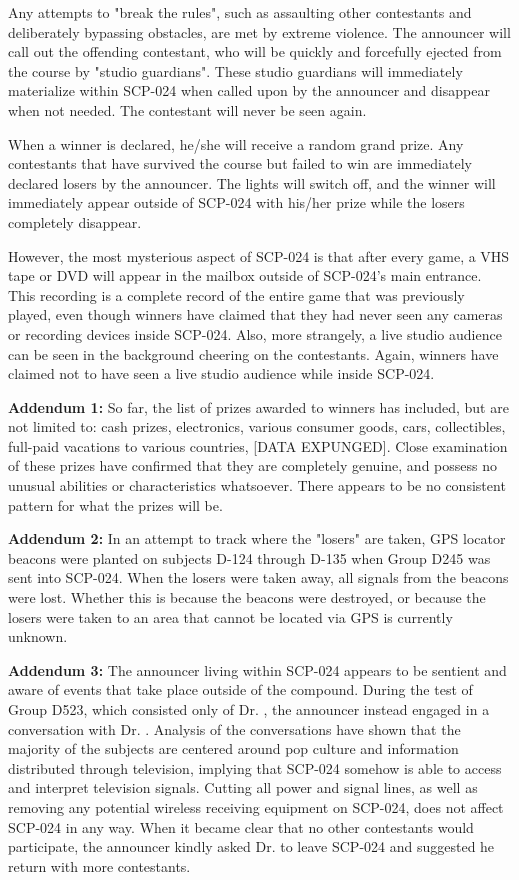 Any attempts to "break the rules", such as assaulting other contestants and deliberately bypassing obstacles, are met by extreme violence. The announcer will call out the offending contestant, who will be quickly and forcefully ejected from the course by "studio guardians". These studio guardians will immediately materialize within SCP-024 when called upon by the announcer and disappear when not needed. The contestant will never be seen again.

When a winner is declared, he/she will receive a random grand prize. Any contestants that have survived the course but failed to win are immediately declared losers by the announcer. The lights will switch off, and the winner will immediately appear outside of SCP-024 with his/her prize while the losers completely disappear.

However, the most mysterious aspect of SCP-024 is that after every game, a VHS tape or DVD will appear in the mailbox outside of SCP-024's main entrance. This recording is a complete record of the entire game that was previously played, even though winners have claimed that they had never seen any cameras or recording devices inside SCP-024. Also, more strangely, a live studio audience can be seen in the background cheering on the contestants. Again, winners have claimed not to have seen a live studio audience while inside SCP-024.

\textbf{Addendum 1:} So far, the list of prizes awarded to winners has included, but are not limited to: cash prizes, electronics, various consumer goods, cars, collectibles, full-paid vacations to various countries, [DATA EXPUNGED]. Close examination of these prizes have confirmed that they are completely genuine, and possess no unusual abilities or characteristics whatsoever. There appears to be no consistent pattern for what the prizes will be.

\textbf{Addendum 2:} In an attempt to track where the "losers" are taken, GPS locator beacons were planted on subjects D-124 through D-135 when Group D245 was sent into SCP-024. When the losers were taken away, all signals from the beacons were lost. Whether this is because the beacons were destroyed, or because the losers were taken to an area that cannot be located via GPS is currently unknown.

\textbf{Addendum 3:} The announcer living within SCP-024 appears to be sentient and aware of events that take place outside of the compound. During the test of Group D523, which consisted only of Dr. , the announcer instead engaged in a conversation with Dr. . Analysis of the conversations have shown that the majority of the subjects are centered around pop culture and information distributed through television, implying that SCP-024 somehow is able to access and interpret television signals. Cutting all power and signal lines, as well as removing any potential wireless receiving equipment on SCP-024, does not affect SCP-024 in any way. When it became clear that no other contestants would participate, the announcer kindly asked Dr.  to leave SCP-024 and suggested he return with more contestants.

